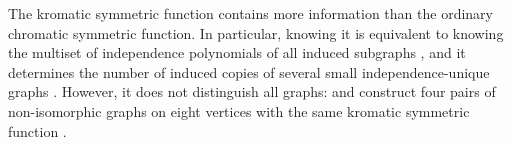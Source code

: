 The kromatic symmetric function contains more information than the ordinary
chromatic symmetric function.  In particular, knowing it is equivalent to
knowing the multiset of independence polynomials of all induced subgraphs
\cite[Cor.~1.6]{Pierson2025}, and it determines the number of induced copies
of several small independence-unique graphs \cite{Pierson2024x}.  However, it
does not distinguish all graphs:  and 
construct four pairs of non-isomorphic graphs on eight vertices with the same
kromatic symmetric function \cite{PiersonSamanta2026}.
